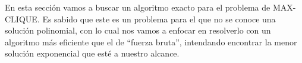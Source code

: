 En esta sección vamos a buscar un algoritmo exacto para el problema de MAX-CLIQUE. Es sabido que este es un problema para el que no se conoce una solución polinomial, con lo cual nos vamos a enfocar en resolverlo con un algoritmo más eficiente que el de ``fuerza bruta'', intendando encontrar la menor solución exponencial que esté a nuestro alcance.
